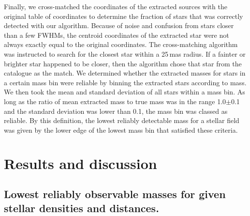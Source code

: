 \documentclass[referee]{aa}
\begin{document}
Finally, we cross-matched the coordinates of the extracted sources with the original table of coordinates to determine the fraction of stars that was correctly detected with our algorithm.
Because of noise and confusion from stars closer than a few FWHMs, the centroid coordinates of the extracted star were not always exactly equal to the original coordinates.
The cross-matching algorithm was instructed to search for the closest star within a 25\,mas radius.
If a fainter or brighter star happened to be closer, then the algorithm chose that star from the catalogue as the match.
We determined whether the extracted masses for stars in a certain mass bin were reliable by binning the extracted stars according to mass.
We then took the mean and standard deviation of all stars within a mass bin.
As long as the ratio of mean extracted mass to true mass was in the range 1.0$\pm$0.1 and the standard deviation was lower than 0.1, the mass bin was classed as reliable.
By this definition, the lowest reliably detectable mass for a stellar field was given by the lower edge of the lowest mass bin that satisfied these criteria.





\section{Results and discussion}
\label{sec:results}

\subsection{Lowest reliably observable masses for given stellar densities and distances.}
  \label{subsec:lowest_mass}
\end{document}

